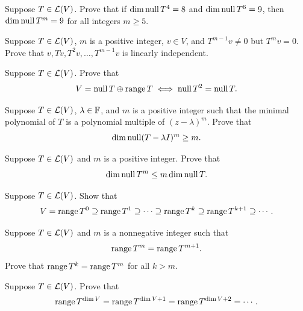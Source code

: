 \begin{exc}

\begin{exercise}
Suppose $T\in\mathcal{L}(V)$. Prove that if $\operatorname{dim}\operatorname{null} T^4=8$ and $\operatorname{dim}\operatorname{null} T^6=9$,
then $\operatorname{dim}\operatorname{null} T^m=9$ for all integers $m\ge5$.
\end{exercise}

\begin{exercise}
Suppose $T\in\mathcal{L}(V)$, $m$ is a positive integer, $v\in V$, and
$T^{m-1}v\ne0$ but $T^mv=0$. Prove that $v,Tv,T^2v,\dots,T^{m-1}v$ is linearly
independent.
\end{exercise}

\begin{exercise}
Suppose $T\in\mathcal{L}(V)$. Prove that
\[ V = \operatorname{null} T\oplus\operatorname{range} T \iff \operatorname{null} T^2 = \operatorname{null} T. \]
\end{exercise}

\begin{exercise}
Suppose $T\in\mathcal{L}(V)$, $\lambda\in\mathbb{F}$, and $m$ is a positive integer such that
the minimal polynomial of $T$ is a polynomial multiple of $(z-\lambda)^m$.
Prove that
\[ \operatorname{dim}\operatorname{null}(T-\lambda I)^m \ge m. \]
\end{exercise}

\begin{exercise}
Suppose $T\in\mathcal{L}(V)$ and $m$ is a positive integer. Prove that
\[ \operatorname{dim}\operatorname{null} T^m \le m\operatorname{dim}\operatorname{null} T. \]
\end{exercise}

\begin{exercise}
Suppose $T\in\mathcal{L}(V)$. Show that
\[ V = \operatorname{range} T^0 \supseteq \operatorname{range} T^1 \supseteq \cdots \supseteq \operatorname{range} T^k
   \supseteq \operatorname{range} T^{k+1} \supseteq \cdots. \]
\end{exercise}

\begin{exercise}
Suppose $T\in\mathcal{L}(V)$ and $m$ is a nonnegative integer such that
\[ \operatorname{range} T^m = \operatorname{range} T^{m+1}. \]
Prove that $\operatorname{range} T^k=\operatorname{range} T^m$ for all $k>m$.
\end{exercise}

\begin{exercise}
Suppose $T\in\mathcal{L}(V)$. Prove that
\[ \operatorname{range} T^{\operatorname{dim} V} = \operatorname{range} T^{\operatorname{dim} V+1} = \operatorname{range} T^{\operatorname{dim} V+2} = \cdots. \]
\end{exercise}


\end{exc}
